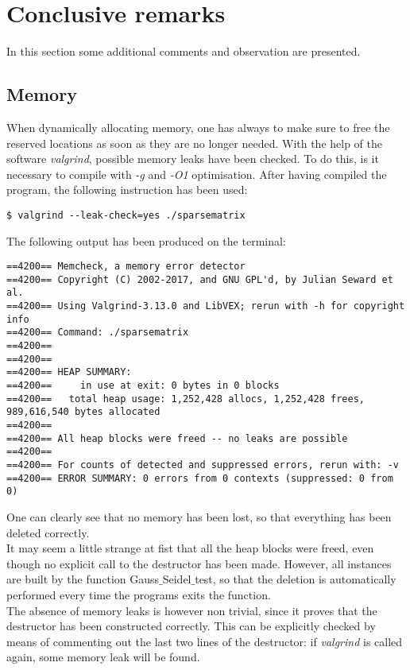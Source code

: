 \documentclass[11pt]{article}
\theoremstyle{theorem}
\theoremstyle{definition}
\begin{document}
\section{Conclusive remarks}
In this section some additional comments and observation are presented.

\subsection{Memory}
When dynamically allocating memory, one has always to make sure to free the reserved locations as soon as they are no longer needed. With the help of the software \emph{valgrind}, possible memory leaks have been checked. To do this, is it necessary to compile with \emph{-g} and \emph{-O1} optimisation. After having compiled the program, the following instruction has been used:

\begin{verbatim}
$ valgrind --leak-check=yes ./sparsematrix
\end{verbatim}

The following output has been produced on the terminal:

\begin{verbatim}
==4200== Memcheck, a memory error detector
==4200== Copyright (C) 2002-2017, and GNU GPL'd, by Julian Seward et al.
==4200== Using Valgrind-3.13.0 and LibVEX; rerun with -h for copyright info
==4200== Command: ./sparsematrix
==4200== 
==4200== 
==4200== HEAP SUMMARY:
==4200==     in use at exit: 0 bytes in 0 blocks
==4200==   total heap usage: 1,252,428 allocs, 1,252,428 frees, 989,616,540 bytes allocated
==4200== 
==4200== All heap blocks were freed -- no leaks are possible
==4200== 
==4200== For counts of detected and suppressed errors, rerun with: -v
==4200== ERROR SUMMARY: 0 errors from 0 contexts (suppressed: 0 from 0)
\end{verbatim}

One can clearly see that no memory has been lost, so that everything has been deleted correctly. \\
It may seem a little strange at fist that all the heap blocks were freed, even though no explicit call to the destructor has been made. However, all instances are built by the function Gauss$\_$Seidel$\_$test, so that the deletion is automatically performed every time the programs exits the function.\\
The absence of memory leaks is however non trivial, since it proves that the destructor has been constructed correctly. This can be explicitly checked by means of commenting out the last two lines of the destructor: if \emph{valgrind} is called again, some memory leak will be found.\\ 
\end{document}
